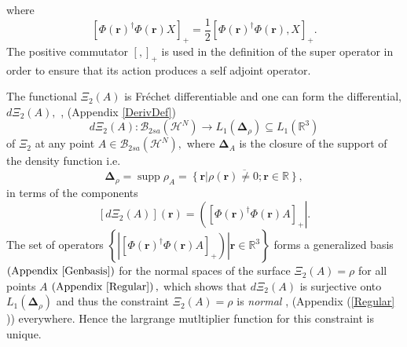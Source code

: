 \documentclass[aps,preprint]{revtex4}%
\begin{document}
where
\begin{equation}
\left[  \Phi\left(  \boldsymbol{r}\right)  ^{\dagger}\Phi\left(
\boldsymbol{r}\right)  X\right]  _{+}=\frac{1}{2}\left[  \Phi\left(
\boldsymbol{r}\right)  ^{\dagger}\Phi\left(  \boldsymbol{r}\right)  ,X\right]
_{+}.
\end{equation}
The positive commutator $\left[  ,\right]  _{+}$ is used in the definition of
the super operator in order to ensure that its action produces a self adjoint operator.

The functional $\Xi_{2}\left(  A\right)  $ is Fr\'{e}chet differentiable and
one can form the differential, $d\Xi_{2}\left(  A\right)  ,$ \cite{Encyclo},
(Appendix \ref{DerivDef})
\begin{equation}
d\Xi_{2}\left(  A\right)  :\mathcal{B}_{2sa}\left(  \mathcal{H}^{N}\right)
\rightarrow L_{1}\left(  \boldsymbol{\Delta}_{\rho}\right)  \subseteq
L_{1}\left(  \mathbb{R}^{3}\right)
\end{equation}
of $\Xi_{2}$ at any point $A\in\mathcal{B}_{2sa}\left(  \mathcal{H}%
^{N}\right)  ,$ where $\boldsymbol{\Delta}_{A}$ is the closure of the support
of the density function i.e.
\begin{equation}
\boldsymbol{\Delta}_{\rho}=\operatorname*{supp}\rho_{A}=\overline{\left\{
\left.  \mathbf{r}\right\vert \rho\left(  \mathbf{r}\right)  \neq
0;\mathbf{r\in}\mathbb{R}\right\}  },
\end{equation}
in terms of the components
\begin{equation}
\left[  d\Xi_{2}\left(  A\right)  \right]  \left(  \boldsymbol{r}\right)
=\left(  \left[  \Phi\left(  \boldsymbol{r}\right)  ^{\dagger}\Phi\left(
\boldsymbol{r}\right)  A\right]  _{+}\right\vert .
\end{equation}
The set of operators $\left\{  \left.  \left\vert \left[  \Phi\left(
\boldsymbol{r}\right)  ^{\dagger}\Phi\left(  \boldsymbol{r}\right)  A\right]
_{+}\right)  \right\vert \boldsymbol{r\in}\mathbb{R}^{3}\right\}  $ forms a
generalized basis $\left(  \text{Appendix \ref{Genbasis}}\right)  $ for the
normal spaces of the surface $\Xi_{2}\left(  A\right)  =\rho$ for all points
$A$ $\left(  \text{Appendix \ref{Regular}}\right)  ,$ which shows that
$d\Xi_{2}\left(  A\right)  $ is surjective \cite{Encyclo} onto $L_{1}\left(
\boldsymbol{\Delta}_{\rho}\right)  $ and thus the constraint $\Xi_{2}\left(
A\right)  =\rho$ is \emph{normal} \cite{Hestenes75}, (Appendix (\ref{Regular}%
)) everywhere. Hence the largrange mutltiplier function for this constraint is unique.
\end{document}

